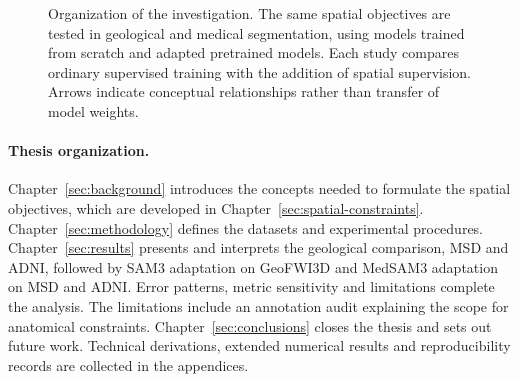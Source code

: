 \documentclass[12pt,a4paper]{article}
\begin{document}
\begin{figure}[htbp]
\caption{Organization of the investigation. The same spatial objectives are
tested in geological and medical segmentation, using models trained from
scratch and adapted pretrained models. Each study compares ordinary
supervised training with the addition of spatial supervision. Arrows
indicate conceptual relationships rather than transfer of model weights.}

\label{fig:thesis-overview}
\end{figure}

\paragraph{Thesis organization.}\label{sec:organization}
Chapter~\ref{sec:background} introduces the concepts needed to formulate
the spatial objectives, which are developed in
Chapter~\ref{sec:spatial-constraints}. Chapter~\ref{sec:methodology}
defines the datasets and experimental procedures.
Chapter~\ref{sec:results} presents and interprets the geological comparison,
MSD and ADNI, followed by SAM3 adaptation on GeoFWI3D and MedSAM3
adaptation on MSD and ADNI. Error patterns, metric
sensitivity and limitations complete the analysis. The limitations include
an annotation audit explaining the scope for anatomical constraints.
Chapter~\ref{sec:conclusions} closes the thesis and sets out future work. Technical derivations, extended numerical results
and reproducibility records are collected in the appendices.
\end{document}

